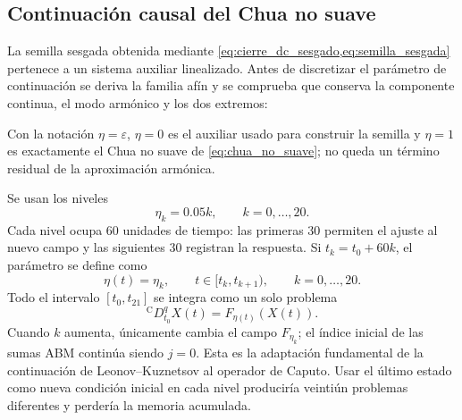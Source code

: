 \subsection{Continuación causal del Chua no suave}
\label{sec:continuacion_causal}

La semilla sesgada obtenida mediante
\cref{eq:cierre_dc_sesgado,eq:semilla_sesgada} pertenece a un sistema
auxiliar linealizado. Antes de discretizar el parámetro de continuación se
deriva la familia afín y se comprueba que conserva la componente continua, el
modo armónico y los dos extremos:
\begingroup
\def\HAFOderivationpart{10}

\endgroup

Con la notación \(\eta=\varepsilon\),
\(\eta=0\) es el auxiliar usado para construir la semilla y \(\eta=1\) es
exactamente el Chua no suave de \cref{eq:chua_no_suave}; no queda un término
residual de la aproximación armónica.

Se usan los niveles
\begin{equation}
\eta_k=0.05k,\qquad k=0,\ldots,20.
\label{eq:niveles_eta}
\end{equation}
Cada nivel ocupa \(60\) unidades de tiempo: las primeras \(30\) permiten el
ajuste al nuevo campo y las siguientes \(30\) registran la respuesta. Si
\(t_k=t_0+60k\), el parámetro se define como
\begin{equation}
\eta(t)=\eta_k,
\qquad t\in[t_k,t_{k+1}),\qquad k=0,\ldots,20.
\label{eq:eta_tiempo}
\end{equation}
Todo el intervalo \([t_0,t_{21}]\) se integra como un solo problema
\begin{equation}
{}^{\mathrm C}D_{t_0}^{q}X(t)=F_{\eta(t)}(X(t)).
\label{eq:continuacion_unica_historia}
\end{equation}
Cuando \(k\) aumenta, únicamente cambia el campo \(F_{\eta_k}\); el índice
inicial de las sumas ABM continúa siendo \(j=0\). Esta es la adaptación
fundamental de la continuación de Leonov--Kuznetsov al operador de Caputo.
Usar el último estado como nueva condición inicial en cada nivel produciría
veintiún problemas diferentes y perdería la memoria acumulada.

